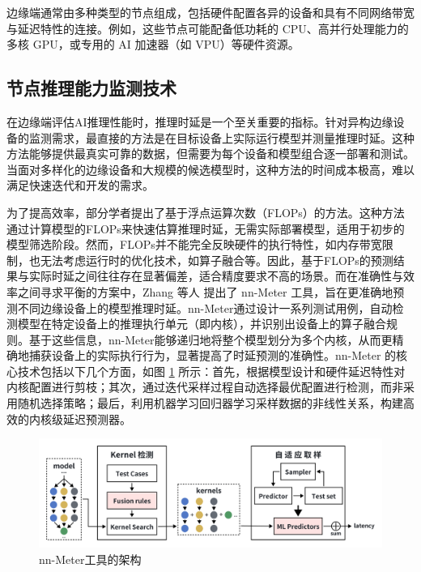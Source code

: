 边缘端通常由多种类型的节点组成，包括硬件配置各异的设备和具有不同网络带宽与延迟特性的连接\cite{cooke2020model,varghese2021survey,barbalace2020edge}。例如，这些节点可能配备低功耗的 CPU、高并行处理能力的多核 GPU，或专用的 AI 加速器（如 VPU）等硬件资源。

\subsection{节点推理能力监测技术}

在边缘端评估AI推理性能时，推理时延是一个至关重要的指标。针对异构边缘设备的监测需求，最直接的方法是在目标设备上实际运行模型并测量推理时延。这种方法能够提供最真实可靠的数据，但需要为每个设备和模型组合逐一部署和测试。当面对多样化的边缘设备和大规模的候选模型时，这种方法的时间成本极高，难以满足快速迭代和开发的需求。

为了提高效率，部分学者\cite{he2018amc,tan2019mnasnet}提出了基于浮点运算次数（FLOPs）的方法。这种方法通过计算模型的FLOPs来快速估算推理时延，无需实际部署模型，适用于初步的模型筛选阶段。然而，FLOPs并不能完全反映硬件的执行特性，如内存带宽限制，也无法考虑运行时的优化技术，如算子融合等。因此，基于FLOPs的预测结果与实际时延之间往往存在显著偏差，适合精度要求不高的场景。而在准确性与效率之间寻求平衡的方案中，Zhang 等人\cite{zhang2021nn} 提出了 nn-Meter 工具，旨在更准确地预测不同边缘设备上的模型推理时延。nn-Meter通过设计一系列测试用例，自动检测模型在特定设备上的推理执行单元（即内核），并识别出设备上的算子融合规则。基于这些信息，nn-Meter能够递归地将整个模型划分为多个内核，从而更精确地捕获设备上的实际执行行为，显著提高了时延预测的准确性。nn-Meter 的核心技术包括以下几个方面，如图 \ref{fig:2-5nnmeter} 所示：首先，根据模型设计和硬件延迟特性对内核配置进行剪枝；其次，通过迭代采样过程自动选择最优配置进行检测，而非采用随机选择策略；最后，利用机器学习回归器学习采样数据的非线性关系，构建高效的内核级延迟预测器。

\begin{figure}[ht]
  \centering
  \includegraphics[width=\linewidth]{pics/2-5nnmeter.png}
  \caption{nn-Meter工具的架构}
  \label{fig:2-5nnmeter}
\end{figure}

